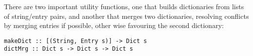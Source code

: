 There are two important utility functions,
one that builds dictionaries from lists of string/entry pairs,
and another that merges two dictionaries, resolving conflicts
by merging entries if possible, other wise favouring the
second dictionary:
\begin{verbatim}
makeDict :: [(String, Entry s)] -> Dict s
dictMrg :: Dict s -> Dict s -> Dict s
\end{verbatim}
